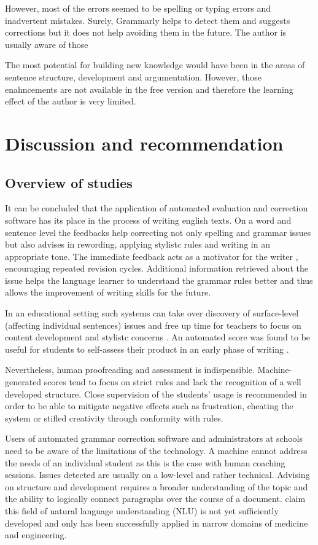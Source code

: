 \documentclass[runningheads]{llncs}
\let\OldTextregistered\textregistered
\renewcommand{\textregistered}{\OldTextregistered\xspace}%
\begin{document}
However, most of the errors seemed to be spelling or typing errors and inadvertent mistakes. Surely, Grammarly\textregistered helps to detect them and suggests corrections but it does not help avoiding them in the future. The author is usually aware of those 

The most potential for building new knowledge would have been in the areas of sentence structure, development and argumentation. However, those enahncements are not available in the free version and therefore the learning effect of the author is very limited.

\section{Discussion and recommendation}
\subsection{Overview of studies}
It can be concluded that the application of automated evaluation and correction software has its place in the process of writing english texts. On a word and sentence level the feedbacks help correcting not only spelling and grammar issues but also advises in rewording, applying stylistc rules and writing in an appropriate tone. The immediate feedback acts as a motivator for the writer \citep{grimes_utility_2010}, encouraging repeated revision cycles. Additional information retrieved about the issue helps the language learner to understand the grammar rules better and thus allows the improvement of writing skills for the future. 

In an educational setting such systems can take 
over discovery of surface-level (affecting individual sentences) issues and free up time for teachers to focus on content development and stylistc concerns \citep{dembsey_closing_2017}. An automated score was found to be useful for students to self-assess their product in an early phase of writing \citep{grimes_utility_2010}. 

Nevertheless, human proofreading and assessment is indispensible. Machine-generated scores tend to focus on strict rules and lack the recognition of a well developed structure. Close supervision of the students' usage is recommended in order to be able to mitigate negative effects such as frustration, cheating the system or stifled creativity through conformity with rules.

Users of automated grammar correction software and administrators at schools need to be aware of the limitations of the technology. A machine cannot address the needs of an individual student as this is the case with human coaching sessions. Issues detected are usually on a low-level and rather technical. Advising on structure and development requires a broader understanding of the topic and the ability to logically connect paragraphs over the course of a document. \textcite{grimes_utility_2010} claim this field of natural language understanding (NLU) is not yet sufficiently developed and only has been successfully applied in narrow domains of medicine and engineering.
\end{document}
